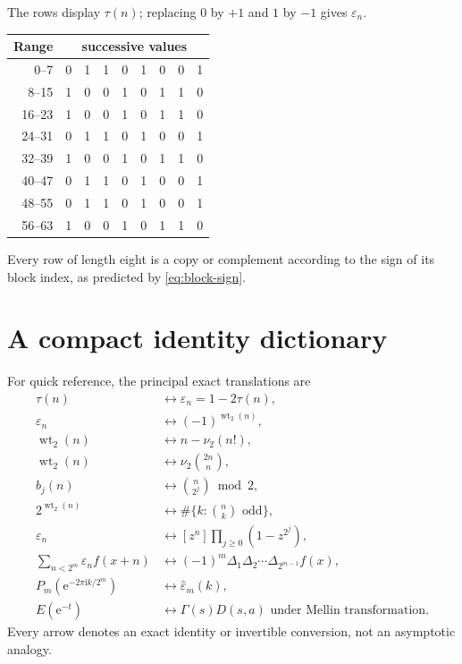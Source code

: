 \documentclass[11pt,oneside]{article}
\numberwithin{equation}{section}
\theoremstyle{definition}
\theoremstyle{remark}
\newcommand{\e}{\mathrm e}
\newcommand{\ii}{\mathrm i}
\newcommand{\wt}{\operatorname{wt}_2}
\newcommand{\vtwo}{\nu_2}
\newcommand{\eps}{\varepsilon}
\begin{document}
The rows display \(\tau(n)\); replacing \(0\) by \(+1\) and \(1\) by
\(-1\) gives \(\eps_n\).

\begin{center}
\small
\begin{longtable}{@{}r|*{8}{c}@{}}
\toprule
Range & \multicolumn{8}{c}{successive values}\\
\midrule
\endhead
0--7   & 0&1&1&0&1&0&0&1\\
8--15  & 1&0&0&1&0&1&1&0\\
16--23 & 1&0&0&1&0&1&1&0\\
24--31 & 0&1&1&0&1&0&0&1\\
32--39 & 1&0&0&1&0&1&1&0\\
40--47 & 0&1&1&0&1&0&0&1\\
48--55 & 0&1&1&0&1&0&0&1\\
56--63 & 1&0&0&1&0&1&1&0\\
\bottomrule
\end{longtable}
\end{center}

Every row of length eight is a copy or complement according to the sign of its
block index, as predicted by \eqref{eq:block-sign}.

\section[Identity dictionary]{A compact identity dictionary}
\label{app:identity-dictionary}

For quick reference, the principal exact translations are
\begin{align*}
 \tau(n)
 &\longleftrightarrow \eps_n=1-2\tau(n),\\
 \eps_n
 &\longleftrightarrow (-1)^{\wt(n)},\\
 \wt(n)
 &\longleftrightarrow n-\vtwo(n!),\\
 \wt(n)
 &\longleftrightarrow \vtwo\binom{2n}{n},\\
 b_j(n)
 &\longleftrightarrow \binom{n}{2^j}\bmod2,\\
 2^{\wt(n)}
 &\longleftrightarrow \#\{k:\binom nk\text{ odd}\},\\
 \eps_n
 &\longleftrightarrow [z^n]\prod_{j\ge0}(1-z^{2^j}),\\
 \sum_{n<2^m}\eps_nf(x+n)
 &\longleftrightarrow (-1)^m\Delta_1\Delta_2\cdots
   \Delta_{2^{m-1}}f(x),\\
 P_m(\e^{-2\pi\ii k/2^m})
 &\longleftrightarrow \widehat\eps_m(k),\\
 E(\e^{-t})
 &\longleftrightarrow \Gamma(s)D(s,a)
  \text{ under Mellin transformation}.
\end{align*}
Every arrow denotes an exact identity or invertible conversion, not an
asymptotic analogy.
\end{document}
